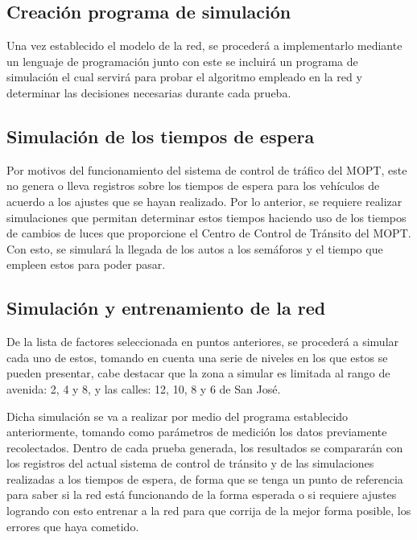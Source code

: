 \subsection{Creaci\'{o}n programa de simulaci\'{o}n}
	
	Una vez establecido el modelo de la red, se proceder\'{a} a implementarlo
	mediante un lenguaje de programaci\'{o}n junto con este se incluir\'{a} un
	programa de simulaci\'{o}n el cual servir\'{a} para probar el algoritmo
	empleado en la red y determinar las decisiones necesarias durante cada prueba.

\subsection{Simulaci\'{o}n de los tiempos de espera}

	Por motivos del funcionamiento del sistema de control de tr\'{a}fico del MOPT,
este no genera o lleva registros sobre los tiempos de espera para los
veh\'{i}culos de acuerdo a los ajustes que se hayan realizado. Por lo anterior,
se requiere realizar simulaciones que permitan determinar estos tiempos haciendo
uso de los tiempos de cambios de luces que proporcione el Centro de Control de
Tr\'{a}nsito del MOPT. Con esto, se simular\'{a} la llegada de los autos a los
sem\'{a}foros y el tiempo que empleen estos para poder pasar.

\subsection{Simulaci\'{o}n y entrenamiento de la red}

	De la lista de factores seleccionada en puntos anteriores, se proceder\'{a} a
simular cada uno de estos, tomando en cuenta una serie de niveles en los que
estos se pueden presentar, cabe destacar que la zona a simular es limitada al
rango de avenida: 2, 4 y 8,  y las calles: 12, 10, 8 y 6 de San Jos\'{e}.

	Dicha simulaci\'{o}n se va a realizar por medio del programa establecido
anteriormente, tomando como par\'{a}metros de medici\'{o}n los datos previamente
recolectados. Dentro de cada prueba generada, los resultados se comparar\'{a}n
con los registros del actual sistema de control de tr\'{a}nsito y de las
simulaciones realizadas a los tiempos de espera, de forma que se tenga un punto
de referencia para saber si la red est\'{a} funcionando de la forma esperada o si requiere ajustes logrando con esto entrenar a la red para
que corrija de la mejor forma posible, los errores que haya cometido.


